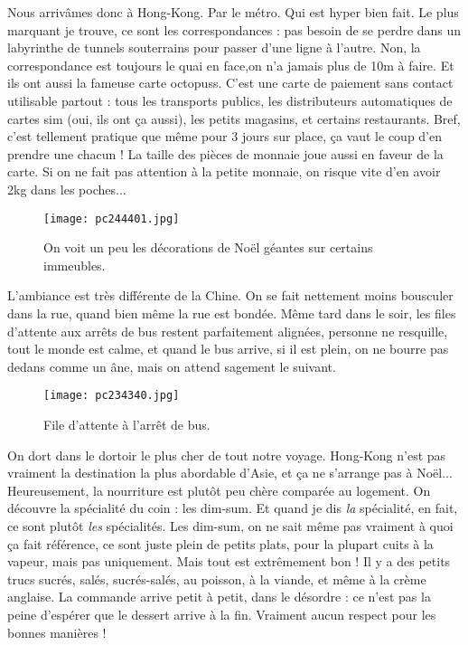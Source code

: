 \documentclass{book}
\begin{document}
Nous arrivâmes donc à Hong-Kong. Par le métro. Qui est hyper bien fait. Le plus marquant je trouve, ce sont les correspondances : pas besoin de se perdre dans un labyrinthe de tunnels souterrains pour passer d'une ligne à l'autre. Non, la correspondance est toujours le quai en face,on n'a jamais plus de 10m à faire. Et ils ont aussi la fameuse carte octopuss. C'est une carte de paiement sans contact utilisable partout : tous les transports publics, les distributeurs automatiques de cartes sim (oui, ils ont ça aussi), les petits magasins, et certains restaurants. Bref, c'est tellement pratique que même pour 3 jours sur place, ça vaut le coup d'en prendre une chacun ! La taille des pièces de monnaie joue aussi en faveur de la carte. Si on ne fait pas attention à la petite monnaie, on risque vite d'en avoir 2kg dans les poches...


\begin{figure}[h]
\centering
\texttt{[image: pc244401.jpg]}
\caption*{On voit un peu les décorations de Noël géantes sur certains immeubles.}
\end{figure}

L'ambiance est très différente de la Chine. On se fait nettement moins bousculer dans la rue, quand bien même la rue est bondée. Même tard dans le soir, les files d'attente aux arrêts de bus restent parfaitement alignées, personne ne resquille, tout le monde est calme, et quand le bus arrive, si il est plein, on ne bourre pas dedans comme un âne, mais on attend sagement le suivant.


\begin{wrapfigure}{l}{0.55\textwidth}
\centering
\texttt{[image: pc234340.jpg]}
\caption*{File d'attente à l'arrêt de bus.}
\end{wrapfigure}

On dort dans le dortoir le plus cher de tout notre voyage. Hong-Kong n'est pas vraiment la destination la plus abordable d'Asie, et ça ne s'arrange pas à Noël... Heureusement, la nourriture est plutôt peu chère comparée au logement. On découvre la spécialité du coin : les dim-sum. Et quand je dis \emph{la} spécialité, en fait, ce sont plutôt \emph{les} spécialités. Les dim-sum, on ne sait même pas vraiment à quoi ça fait référence, ce sont juste plein de petits plats, pour la plupart cuits à la vapeur, mais pas uniquement. Mais tout est extrêmement bon ! Il y a des petits trucs sucrés, salés, sucrés-salés, au poisson, à la viande, et même à la crème anglaise. La commande arrive petit à petit, dans le désordre : ce n'est pas la peine d'espérer que le dessert arrive à la fin. Vraiment aucun respect pour les bonnes manières !
\end{document}
